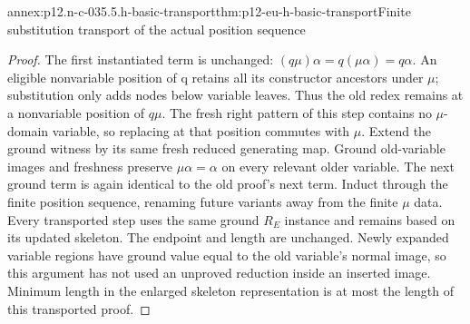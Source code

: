 \begin{annexitem}{annex:p12.n-c-035.5.h-basic-transport}{thm:p12-eu-h-basic-transport}{Finite substitution transport of the actual position sequence}
\begin{proof}
The first instantiated term is unchanged:
\((q\mu)\alpha=q(\mu\alpha)=q\alpha\).
An eligible nonvariable position of q retains all its constructor
ancestors under \(\mu\); substitution only adds nodes below
variable leaves. Thus the old redex remains at a nonvariable
position of \(q\mu\). The fresh right pattern of this step
contains no \(\mu\)-domain variable, so replacing at that
position commutes with \(\mu\). Extend the ground witness
by its same fresh reduced generating map. Ground old-variable
images and freshness preserve \(\mu\alpha=\alpha\) on
every relevant older variable. The next ground term is again
identical to the old proof's next term. Induct through the finite
position sequence, renaming future variants away from the finite
\(\mu\) data. Every transported step uses the same ground
\(R_E\) instance and remains based on its updated skeleton.
The endpoint and length are unchanged. Newly expanded variable
regions have ground value equal to the old variable's normal
image, so this argument has not used an unproved reduction inside
an inserted image. Minimum length in the enlarged skeleton
representation is at most the length of this transported proof.
\end{proof}
\end{annexitem}

